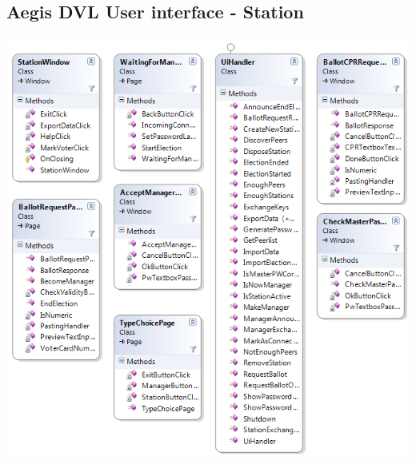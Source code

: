 \documentclass[a4paper]{report}
\begin{document}
\subsection*{ Aegis DVL User interface - Station}
\begin{center}
\includegraphics[width=\textwidth]{UIClassdiagram_Station.png}
\end{center}
\end{document}

